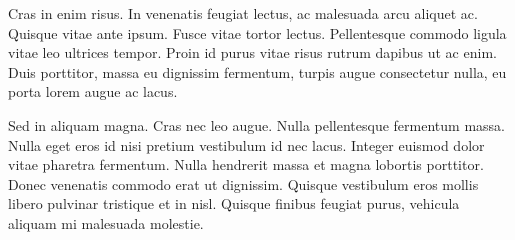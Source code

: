 \documentclass{book}
\begin{document}
Cras in enim risus. In venenatis feugiat lectus, ac malesuada arcu aliquet
ac. Quisque vitae ante ipsum. Fusce vitae tortor lectus. Pellentesque commodo
ligula vitae leo ultrices tempor. Proin id purus vitae risus rutrum dapibus ut
ac enim. Duis porttitor, massa eu dignissim fermentum, turpis augue consectetur
nulla, eu porta lorem augue ac lacus.

Sed in aliquam magna. Cras nec leo augue. Nulla pellentesque fermentum
massa. Nulla eget eros id nisi pretium vestibulum id nec lacus. Integer euismod
dolor vitae pharetra fermentum. Nulla hendrerit massa et magna lobortis
porttitor. Donec venenatis commodo erat ut dignissim. Quisque vestibulum eros
mollis libero pulvinar tristique et in nisl. Quisque finibus feugiat purus,
vehicula aliquam mi malesuada molestie.



\end{document}

